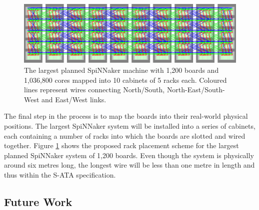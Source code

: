 			\label{sec:mapping-spinnaker-to-cabinets}
			
			\begin{figure}
				\center
				\includegraphics[width=\textwidth]{figures/spinnaker106}
				\caption[SpiNNaker machine mapped into cabinets and racks.]{The largest
				planned SpiNNaker machine with 1,200 boards and 1,036,800 cores mapped
				into 10 cabinets of 5 racks each.  Coloured lines represent wires
				connecting {\color{red}North/South},
				{\color{green}North-East/South-West} and {\color{blue}East/West} links.}
				\label{fig:spinnaker106}
			\end{figure}
			
			The final step in the process is to map the boards into their real-world
			physical positions. The largest SpiNNaker system will be installed into a
			series of cabinets, each containing a number of racks into which the
			boards are slotted and wired together. Figure \ref{fig:spinnaker106} shows
			the proposed rack placement scheme for the largest planned SpiNNaker
			system of 1,200 boards. Even though the system is physically around six
			metres long, the longest wire will be less than one metre in length and
			thus within the S-ATA specification.
		
		\subsection{Future Work}
			
			
